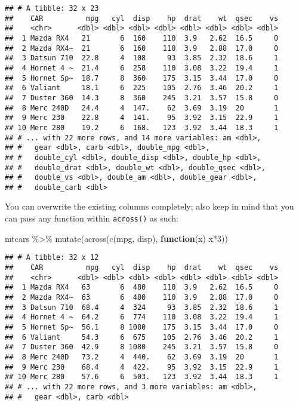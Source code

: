 \documentclass[
]{book}
\newenvironment{Shaded}{\begin{snugshade}}{\end{snugshade}}
\newcommand{\ControlFlowTok}[1]{\textcolor[rgb]{0.13,0.29,0.53}{\textbf{#1}}}
\newcommand{\DecValTok}[1]{\textcolor[rgb]{0.00,0.00,0.81}{#1}}
\newcommand{\FunctionTok}[1]{\textcolor[rgb]{0.00,0.00,0.00}{#1}}
\newcommand{\NormalTok}[1]{#1}
\newcommand{\SpecialCharTok}[1]{\textcolor[rgb]{0.00,0.00,0.00}{#1}}
\begin{document}
\begin{verbatim}
## # A tibble: 32 x 23
##    CAR          mpg   cyl  disp    hp  drat    wt  qsec    vs
##    <chr>      <dbl> <dbl> <dbl> <dbl> <dbl> <dbl> <dbl> <dbl>
##  1 Mazda RX4   21       6  160    110  3.9   2.62  16.5     0
##  2 Mazda RX4~  21       6  160    110  3.9   2.88  17.0     0
##  3 Datsun 710  22.8     4  108     93  3.85  2.32  18.6     1
##  4 Hornet 4 ~  21.4     6  258    110  3.08  3.22  19.4     1
##  5 Hornet Sp~  18.7     8  360    175  3.15  3.44  17.0     0
##  6 Valiant     18.1     6  225    105  2.76  3.46  20.2     1
##  7 Duster 360  14.3     8  360    245  3.21  3.57  15.8     0
##  8 Merc 240D   24.4     4  147.    62  3.69  3.19  20       1
##  9 Merc 230    22.8     4  141.    95  3.92  3.15  22.9     1
## 10 Merc 280    19.2     6  168.   123  3.92  3.44  18.3     1
## # ... with 22 more rows, and 14 more variables: am <dbl>,
## #   gear <dbl>, carb <dbl>, double_mpg <dbl>,
## #   double_cyl <dbl>, double_disp <dbl>, double_hp <dbl>,
## #   double_drat <dbl>, double_wt <dbl>, double_qsec <dbl>,
## #   double_vs <dbl>, double_am <dbl>, double_gear <dbl>,
## #   double_carb <dbl>
\end{verbatim}

You can overwrite the existing columns completely; also keep in mind that you can pass any function within \texttt{across()} as such:

\begin{Shaded}
\begin{Highlighting}[]
\NormalTok{mtcars }\SpecialCharTok{\%\textgreater{}\%} \FunctionTok{mutate}\NormalTok{(}\FunctionTok{across}\NormalTok{(}\FunctionTok{c}\NormalTok{(mpg, disp), }\ControlFlowTok{function}\NormalTok{(x) x}\SpecialCharTok{*}\DecValTok{3}\NormalTok{))}
\end{Highlighting}
\end{Shaded}

\begin{verbatim}
## # A tibble: 32 x 12
##    CAR          mpg   cyl  disp    hp  drat    wt  qsec    vs
##    <chr>      <dbl> <dbl> <dbl> <dbl> <dbl> <dbl> <dbl> <dbl>
##  1 Mazda RX4   63       6  480    110  3.9   2.62  16.5     0
##  2 Mazda RX4~  63       6  480    110  3.9   2.88  17.0     0
##  3 Datsun 710  68.4     4  324     93  3.85  2.32  18.6     1
##  4 Hornet 4 ~  64.2     6  774    110  3.08  3.22  19.4     1
##  5 Hornet Sp~  56.1     8 1080    175  3.15  3.44  17.0     0
##  6 Valiant     54.3     6  675    105  2.76  3.46  20.2     1
##  7 Duster 360  42.9     8 1080    245  3.21  3.57  15.8     0
##  8 Merc 240D   73.2     4  440.    62  3.69  3.19  20       1
##  9 Merc 230    68.4     4  422.    95  3.92  3.15  22.9     1
## 10 Merc 280    57.6     6  503.   123  3.92  3.44  18.3     1
## # ... with 22 more rows, and 3 more variables: am <dbl>,
## #   gear <dbl>, carb <dbl>
\end{verbatim}
\end{document}
